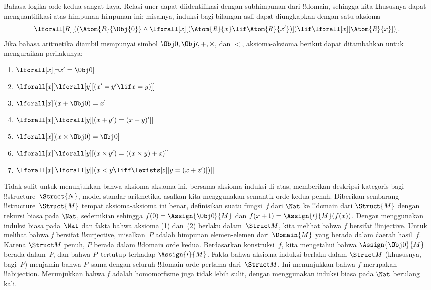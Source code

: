 \documentclass[../../../include/open-logic-section]{subfiles}
\begin{document}
Bahasa logika orde kedua sangat kaya. Relasi uner dapat diidentifikasi dengan
subhimpunan dari !!{domain}, sehingga kita khususnya dapat menguantifikasi
atas himpunan-himpunan ini; misalnya, induksi bagi bilangan asli dapat
diungkapkan dengan satu aksioma
\[
\lforall[R][((\Atom{R}{\Obj{0}} \land \lforall[x][(\Atom{R}{x} \lif
    \Atom{R}{x'})]) \lif \lforall[x][\Atom{R}{x}])].
\]
Jika bahasa aritmetika diambil mempunyai simbol $\Obj 0, \Obj \prime, +,
\times$, dan $<$, aksioma-aksioma berikut dapat ditambahkan untuk menguraikan
perilakunya:
\begin{enumerate}
\item $\lforall[x][\lnot x' = \Obj 0]$
\item $\lforall[x][\lforall[y][(x' = y' \lif x = y)]]$
\item $\lforall[x][(x + \Obj 0) = x]$
\item $\lforall[x][\lforall[y][(x + y') = (x + y)']]$
\item $\lforall[x][(x \times \Obj 0) = \Obj 0]$
\item $\lforall[x][\lforall[y][(x \times y') = ((x \times y) + x)]]$
\item $\lforall[x][\lforall[y][(x < y \liff \lexists[z][y = (x + z')])]]$
\end{enumerate}
Tidak sulit untuk menunjukkan bahwa aksioma-aksioma ini, bersama aksioma
induksi di atas, memberikan deskripsi kategoris bagi !!{structure}~$\Struct{N}$,
model standar aritmetika, asalkan kita menggunakan semantik orde kedua penuh.
Diberikan sembarang !!{structure}~$\Struct{M}$ tempat aksioma-aksioma ini
benar, definisikan suatu fungsi~$f$ dari $\Nat$ ke !!{domain} dari $\Struct{M}$
dengan rekursi biasa pada $\Nat$, sedemikian sehingga $f(0) =
\Assign{\Obj 0}{M}$ dan $f(x+1) = \Assign{\prime}{M}(f(x))$. Dengan
menggunakan induksi biasa pada~$\Nat$ dan fakta bahwa aksioma (1) dan~(2)
berlaku dalam~$\Struct M$, kita melihat bahwa $f$ bersifat !!{injective}.
Untuk melihat bahwa $f$ bersifat !!{surjective}, misalkan~$P$ adalah himpunan
elemen-elemen dari~$\Domain{M}$ yang berada dalam daerah hasil~$f$. Karena
$\Struct M$ penuh, $P$ berada dalam !!{domain} orde kedua. Berdasarkan
konstruksi~$f$, kita mengetahui bahwa $\Assign{\Obj 0}{M}$ berada dalam~$P$,
dan bahwa $P$~tertutup terhadap $\Assign{\prime}{M}$. Fakta bahwa aksioma
induksi berlaku dalam $\Struct M$ (khususnya, bagi~$P$) menjamin bahwa
$P$~sama dengan seluruh !!{domain} orde pertama dari~$\Struct M$. Ini
menunjukkan bahwa $f$ merupakan !!a{bijection}. Menunjukkan bahwa $f$ adalah
homomorfisme juga tidak lebih sulit, dengan menggunakan induksi biasa pada
$\Nat$ berulang kali.
\end{document}
